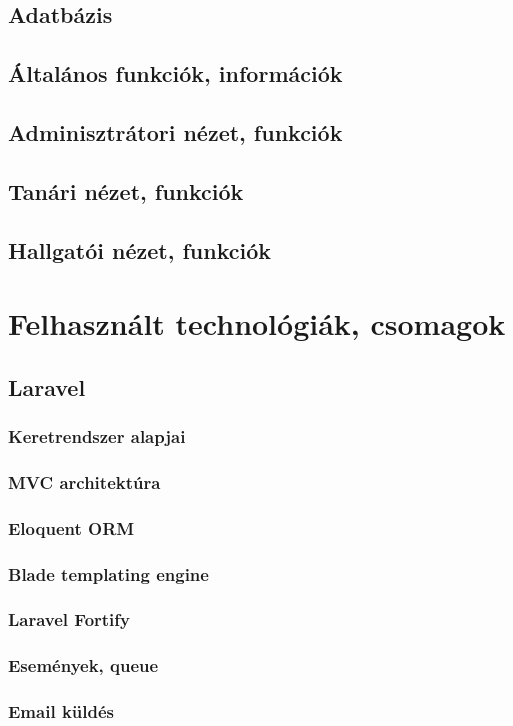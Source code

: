 \documentclass[
]{thesis-ekf}
\theoremstyle{definition}
\theoremstyle{remark}
\begin{document}
\section{Adatbázis}
\section{Általános funkciók, információk}
\section{Adminisztrátori nézet, funkciók}
\section{Tanári nézet, funkciók}
\section{Hallgatói nézet, funkciók}

\chapter{Felhasznált technológiák, csomagok}

\section{Laravel}
\subsection{Keretrendszer alapjai}
\subsection{MVC architektúra}
\subsection{Eloquent ORM}
\subsection{Blade templating engine}
\subsection{Laravel Fortify}
\subsection{Események, queue}
\subsection{Email küldés}
\end{document}
